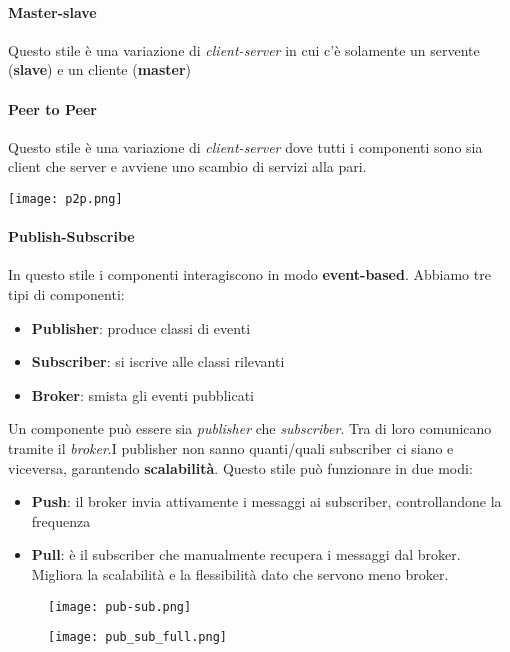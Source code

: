 \paragraph{Master-slave}
Questo stile è una variazione di \textit{client-server} in cui c'è solamente un servente (\textbf{slave}) e un cliente (\textbf{master})

\paragraph{Peer to Peer} Questo stile è una variazione di \textit{client-server} dove tutti i componenti sono sia client che server e avviene uno scambio di servizi alla pari.
\begin{center}
	\texttt{[image: p2p.png]}
\end{center}

\paragraph{Publish-Subscribe} In questo stile i componenti interagiscono in modo \textbf{event-based}. Abbiamo tre tipi di componenti:
\begin{itemize}
	\item \textbf{Publisher}: produce classi di eventi
	\item \textbf{Subscriber}: si iscrive alle classi rilevanti
	\item \textbf{Broker}: smista gli eventi pubblicati
\end{itemize}
Un componente può essere sia \textit{publisher} che \textit{subscriber}. Tra di loro comunicano tramite il \textit{broker}.I publisher non sanno quanti/quali subscriber ci siano e viceversa, garantendo \textbf{scalabilità}.
Questo stile può funzionare in due modi:
\begin{itemize}
	\item \textbf{Push}: il broker invia attivamente i messaggi ai subscriber, controllandone la frequenza
	\item \textbf{Pull}: è il subscriber che manualmente recupera i messaggi dal broker. Migliora la scalabilità e la flessibilità dato che servono meno broker.
\end{itemize}

\begin{figure}[!h]
	\centering
	\begin{minipage}[b]{0.5\textwidth}
		\texttt{[image: pub-sub.png]}
	\end{minipage}
	\hfill
	\begin{minipage}[b]{0.4\textwidth}
		\texttt{[image: pub\_sub\_full.png]}
	\end{minipage}
\end{figure}

